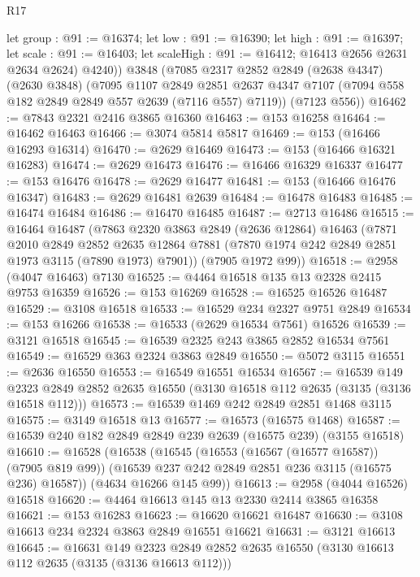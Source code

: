 \begin{lexlean}{R17}
\begin{coremodule}
        let group : @91 := @16374;
        let low : @91 := @16390;
        let high : @91 := @16397;
        let scale : @91 := @16403; let scaleHigh : @91 := @16412; @16413 @2656 @2631 @2634 @2624)
        @4240))
    @3848
    (@7085
      @2317
      @2852
      @2849
      (@2638 @4347)
      (@2630 @3848)
      (@7095
        @1107
        @2849
        @2851
        @2637
        @4347
        @7107
        (@7094 @558 @182 @2849 @2849 @557 @2639 (@7116 @557) @7119))
      (@7123 @556))
@16462 := @7843 @2321 @2416 @3865 @16360
@16463 := @153 @16258
@16464 := @16462 @16463
@16466 := @3074 @5814 @5817
@16469 := @153 (@16466 @16293 @16314)
@16470 := @2629 @16469
@16473 := @153 (@16466 @16321 @16283)
@16474 := @2629 @16473
@16476 := @16466 @16329 @16337
@16477 := @153 @16476
@16478 := @2629 @16477
@16481 := @153 (@16466 @16476 @16347)
@16483 := @2629 @16481 @2639
@16484 := @16478 @16483
@16485 := @16474 @16484
@16486 := @16470 @16485
@16487 := @2713 @16486
@16515 := @16464
    @16487
    (@7863
      @2320
      @3863
      @2849
      (@2636 @12864)
      @16463
      (@7871
        @2010
        @2849
        @2852
        @2635
        @12864
        @7881
        (@7870 @1974 @242 @2849 @2851 @1973 @3115 (@7890 @1973) @7901))
      (@7905 @1972 @99))
@16518 := @2958 (@4047 @16463) @7130
@16525 := @4464 @16518 @135 @13 @2328 @2415 @9753 @16359
@16526 := @153 @16269
@16528 := @16525 @16526 @16487
@16529 := @3108 @16518
@16533 := @16529 @234 @2327 @9751 @2849
@16534 := @153 @16266
@16538 := @16533 (@2629 @16534 @7561) @16526
@16539 := @3121 @16518
@16545 := @16539 @2325 @243 @3865 @2852 @16534 @7561
@16549 := @16529 @363 @2324 @3863 @2849
@16550 := @5072 @3115
@16551 := @2636 @16550
@16553 := @16549 @16551 @16534
@16567 := @16539
    @149
    @2323
    @2849
    @2852
    @2635
    @16550
    (@3130 @16518 @112 @2635 (@3135 (@3136 @16518 @112)))
@16573 := @16539 @1469 @242 @2849 @2851 @1468 @3115
@16575 := @3149 @16518 @13
@16577 := @16573 (@16575 @1468)
@16587 := @16539 @240 @182 @2849 @2849 @239 @2639 (@16575 @239) (@3155 @16518)
@16610 := @16528
    (@16538
      (@16545
        (@16553 (@16567 (@16577 @16587)) (@7905 @819 @99))
        (@16539 @237 @242 @2849 @2851 @236 @3115 (@16575 @236) @16587))
      (@4634 @16266 @145 @99))
@16613 := @2958 (@4044 @16526) @16518
@16620 := @4464 @16613 @145 @13 @2330 @2414 @3865 @16358
@16621 := @153 @16283
@16623 := @16620 @16621 @16487
@16630 := @3108 @16613 @234 @2324 @3863 @2849 @16551 @16621
@16631 := @3121 @16613
@16645 := @16631
    @149
    @2323
    @2849
    @2852
    @2635
    @16550
    (@3130 @16613 @112 @2635 (@3135 (@3136 @16613 @112)))

\end{coremodule}
\end{lexlean}
